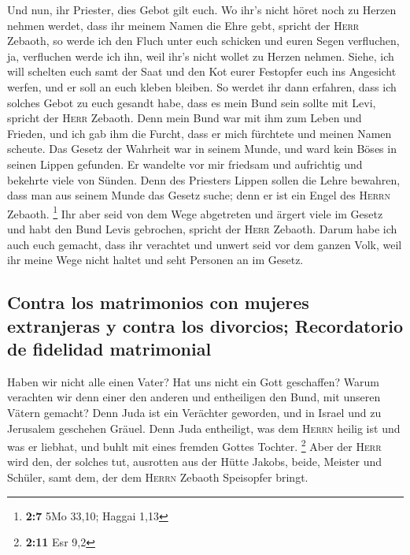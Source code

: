  Und nun, ihr Priester, dies Gebot gilt euch.
 Wo ihr's nicht höret noch zu Herzen nehmen werdet, dass
ihr meinem Namen die Ehre gebt, spricht der \textsc{Herr} Zebaoth, so
werde ich den Fluch unter euch schicken und euren Segen verfluchen, ja,
verfluchen werde ich ihn, weil ihr's nicht wollet zu Herzen nehmen.
 Siehe, ich will schelten euch samt der Saat und den Kot
eurer Festopfer euch ins Angesicht werfen, und er soll an euch kleben
bleiben.  So werdet ihr dann erfahren, dass ich solches
Gebot zu euch gesandt habe, dass es mein Bund sein sollte mit Levi,
spricht der \textsc{Herr} Zebaoth.  Denn mein Bund war mit
ihm zum Leben und Frieden, und ich gab ihm die Furcht, dass er mich
fürchtete und meinen Namen scheute.  Das Gesetz der
Wahrheit war in seinem Munde, und ward kein Böses in seinen Lippen
gefunden. Er wandelte vor mir friedsam und aufrichtig und bekehrte viele
von Sünden.  Denn des Priesters Lippen sollen die Lehre
bewahren, dass man aus seinem Munde das Gesetz suche; denn er ist ein
Engel des \textsc{Herrn} Zebaoth. \footnote{\textbf{2:7} 5Mo 33,10;
  Haggai 1,13}  Ihr aber seid von dem Wege abgetreten und
ärgert viele im Gesetz und habt den Bund Levis gebrochen, spricht der
\textsc{Herr} Zebaoth.  Darum habe ich auch euch gemacht,
dass ihr verachtet und unwert seid vor dem ganzen Volk, weil ihr meine
Wege nicht haltet und seht Personen an im Gesetz.

\hypertarget{contra-los-matrimonios-con-mujeres-extranjeras-y-contra-los-divorcios-recordatorio-de-fidelidad-matrimonial}{%
\subsection{Contra los matrimonios con mujeres extranjeras y contra los
divorcios; Recordatorio de fidelidad
matrimonial}\label{contra-los-matrimonios-con-mujeres-extranjeras-y-contra-los-divorcios-recordatorio-de-fidelidad-matrimonial}}

 Haben wir nicht alle einen Vater? Hat uns nicht ein Gott
geschaffen? Warum verachten wir denn einer den anderen und entheiligen
den Bund, mit unseren Vätern gemacht?  Denn Juda ist ein
Verächter geworden, und in Israel und zu Jerusalem geschehen Gräuel.
Denn Juda entheiligt, was dem \textsc{Herrn} heilig ist und was er
liebhat, und buhlt mit eines fremden Gottes Tochter. \footnote{\textbf{2:11}
  Esr 9,2}  Aber der \textsc{Herr} wird den, der solches
tut, ausrotten aus der Hütte Jakobs, beide, Meister und Schüler, samt
dem, der dem \textsc{Herrn} Zebaoth Speisopfer bringt.


